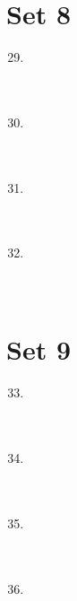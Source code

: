 \documentclass[11pt]{article}
\theoremstyle{definition}
\begin{document}
\eject

\section*{Set 8}

\begin{multicols*}{1} \begin{enumerate} 
\setcounter{enumi}{28}

\item \underline{\phantom{000000000000000}} \\ \\ \\
\item \underline{\phantom{000000000000000}} \\ \\ \\
\item \underline{\phantom{000000000000000}} \\ \\ \\
\item \underline{\phantom{000000000000000}} \\ \\ \\

\end{enumerate} \end{multicols*}

\eject

\section*{Set 9}

\begin{multicols*}{1} \begin{enumerate} 
\setcounter{enumi}{32}

\item \underline{\phantom{000000000000000}} \\ \\ \\
\item \underline{\phantom{000000000000000}} \\ \\ \\
\item \underline{\phantom{000000000000000}} \\ \\ \\
\item \underline{\phantom{000000000000000}} \\ \\ \\

\end{enumerate} \end{multicols*}

\eject
\end{document}
